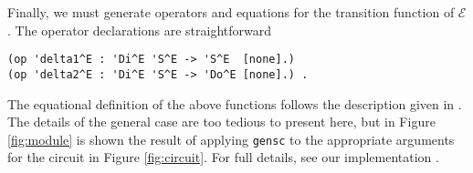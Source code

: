 \documentclass[copyright,creativecommons]{eptcs}
\newcommand{\E}{\mathcal{E}}
\begin{document}
Finally, we must generate operators and equations for the transition function
of $\E$. The operator declarations are straightforward

\begin{center}
\begin{small}
\begin{boxedminipage}{0.60\textwidth}
\begin{verbatim}
(op 'delta1^E : 'Di^E 'S^E -> 'S^E  [none].)
(op 'delta2^E : 'Di^E 'S^E -> 'Do^E [none].) .
\end{verbatim}
\end{boxedminipage}
\end{small}
\end{center}

\noindent
The equational definition of the above functions follows the description given
in \cite{meseguer_2010_01,meseguer_2009_01}. The details of the general case are too tedious to
present here, but in Figure \ref{fig:module} is shown the result of applying
{\tt gensc} to the appropriate arguments for the circuit in Figure
\ref{fig:circuit}. For full details, see our implementation
\cite{katelman_2010_01}.
\end{document}
